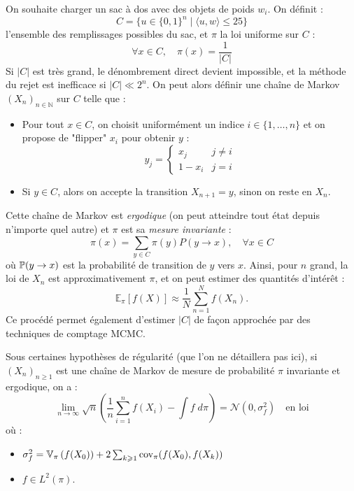 \begin{example}
    On souhaite charger un sac à dos avec des objets de poids  $w_i$. On définit : 
        $$ C = \{u \in \{0,1\}^n \; | \; \langle u, w \rangle \leqslant 25  \} $$ 
    l'ensemble des remplissages possibles du sac, et $\pi$ la loi uniforme sur $C$ : 
        $$ \forall x \in C, \quad \pi(x) = \frac{1}{|C|} $$ 
    Si $|C|$ est très grand, le dénombrement direct devient impossible, et la méthode du rejet est inefficace si $|C| \ll 2^n$.  
    On peut alors définir une chaîne de Markov $(X_n)_{n\in \mathbb{N}}$ sur $C$ telle que : 
    \begin{itemize}
        \item Pour tout $x \in C$, on choisit uniformément un indice $i \in \{1, \dots, n\}$ et on propose de "flipper" $x_i$ pour obtenir $y$ : 
            $$ y_j = 
            \begin{cases}
            x_j & j \neq i \\
            1-x_i & j = i
            \end{cases} $$
        \item Si $y \in C$, alors on accepte la transition $X_{n+1} = y$, sinon on reste en $X_n$.
    \end{itemize}
    Cette chaîne de Markov est \emph{ergodique} (on peut atteindre tout état depuis n'importe quel autre) et $\pi$ est sa \emph{mesure invariante} :  
    \[  \pi(x) = \sum_{y \in C} \pi(y) P(y \to x), \quad \forall x \in C \] 
    où $ \mathbb{P}(y \to x)$ est la probabilité de transition de $y$ vers $x$.  
    Ainsi, pour $n$ grand, la loi de $X_n$ est approximativement $\pi$, et on peut estimer des quantités d'intérêt : 
    \[  \mathbb{E}_{\pi}[f(X)] \approx \frac{1}{N} \sum_{n=1}^{N} f(X_n). \]
    Ce procédé permet également d'estimer $|C|$ de façon approchée par des techniques de comptage MCMC.
\end{example}

\begin{theorem}
    Sous certaines hypothèses de régularité (que l'on ne détaillera pas ici), si $(X_n)_{n \geqslant 1}$ 
    est une chaîne de Markov de mesure de probabilité $ \pi$ invariante et ergodique, on a : 
        $$ \boxed{ \lim_{n \to \infty} \sqrt{n} \left( \frac{1}{n} \sum_{i=1}^{n} f(X_i) - \int f \; d \pi \right) = \mathcal{N}(0, \sigma_f^2) \quad \text{en loi} } $$
    où : 
    \begin{itemize}
        \item $ \sigma_f^2 = \mathbb{V}_\pi \left( f(X_0) \right) + 2 \sum_{k \geqslant 1} \text{cov}_\pi(f(X_0), f(X_k))$ 
        \item $f \in L^2( \pi)$. 
    \end{itemize}
\end{theorem}

